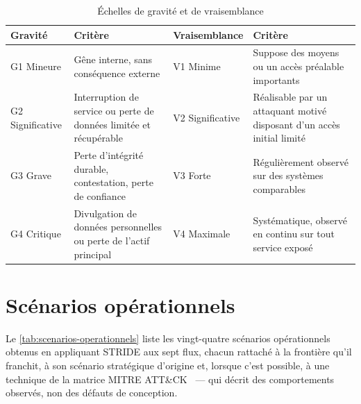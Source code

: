 \begin{table}[htbp]
\caption{Échelles de gravité et de vraisemblance}
\label{tab:echelles}
\centering
\scriptsize
\setlength{\tabcolsep}{4pt}
\begin{tabular}{|P{2.5cm}|P{4.75cm}|P{2.8cm}|P{4.75cm}|}
\hline
\textbf{Gravité} & \textbf{Critère} & \textbf{Vraisemblance} & \textbf{Critère} \\
\hline
G1 Mineure & Gêne interne, sans conséquence externe & V1 Minime & Suppose des moyens ou un accès
préalable importants \\ \hline
G2 Significative & Interruption de service ou perte de données limitée et récupérable &
V2 Significative & Réalisable par un attaquant motivé disposant d'un accès initial limité \\ \hline
G3 Grave & Perte d'intégrité durable, contestation, perte de confiance & V3 Forte & Régulièrement
observé sur des systèmes comparables \\ \hline
G4 Critique & Divulgation de données personnelles ou perte de l'actif principal & V4 Maximale &
Systématique, observé en continu sur tout service exposé \\
\hline
\end{tabular}
\end{table}

\section{Scénarios opérationnels}

Le \cref{tab:scenarios-operationnels} liste les vingt-quatre scénarios opérationnels
obtenus en appliquant STRIDE aux sept flux, chacun rattaché à la frontière qu'il franchit, à son
scénario stratégique d'origine et, lorsque c'est possible, à une technique de la matrice MITRE
ATT\&CK~\cite{mitre_attack} --- qui décrit des comportements observés, non des défauts de
conception.

